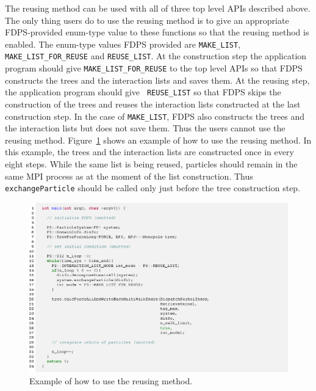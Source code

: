 \documentclass[dvipdfmx]{pasj01}
\begin{document}
The reusing method can be used with all of three top level APIs
described above. The only thing users do to use the reusing method is
to give an appropriate FDPS-provided enum-type value to these
functions so that the reusing method is enabled. The enum-type values
FDPS provided are {\tt MAKE\_LIST}, {\tt MAKE\_LIST\_FOR\_REUSE} and
{\tt REUSE\_LIST}. At the construction step the application program
should give {\tt MAKE\_LIST\_FOR\_REUSE} to the top level APIs so that
FDPS constructs the trees and the interaction lists and saves them. At
the reusing step, the application program should give {\tt
  REUSE\_LIST} so that FDPS skips the construction of the trees and
reuses the interaction lists constructed at the last construction
step. In the case of {\tt MAKE\_LIST}, FDPS also constructs the trees
and the interaction lists but does not save them. Thus the users
cannot use the reusing method. Figure~\ref{fig:reuse} shows an example
of how to use the reusing method. In this example, the trees and the
interaction lists are constructed once in every eight steps. While the
same list is being reused, particles should remain in the same MPI
process as at the moment of the list construction. Thus {\tt
  exchangeParticle} should be called only just before the tree
construction step.

\begin{figure}
    \begin{center}
      \includegraphics[width=13cm]{./fig/snipet/src_reuse.eps}
    \end{center}
    \caption{Example of how to use the reusing method.}
  \label{fig:reuse}
\end{figure}
\end{document}
